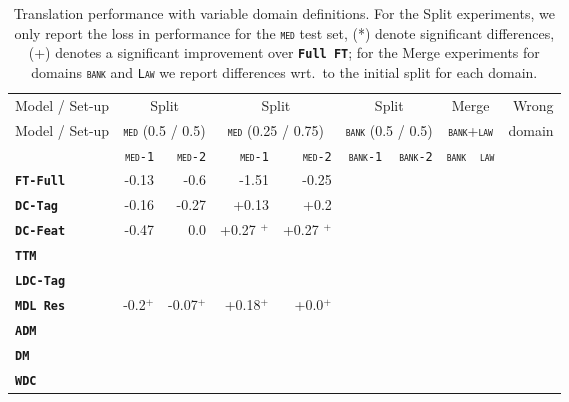 \documentclass[11pt]{article}
\newcommand{\fyTodo}[1]{\Todo[FY:]{\textcolor{orange}{#1}}}
\newcommand{\domain}[1]{\texttt{\textsc{#1}}}
\newcommand{\system}[1]{\texttt{\textbf{#1}}}
\begin{document}
\begin{table}
  \centering
  \begin{tabular}{|p{2.5cm}|*{9}{r|}} \hline
    Model / Set-up & \multicolumn{2}{c|}{Split} &  \multicolumn{2}{c|}{Split} & \multicolumn{2}{c|}{Split} & \multicolumn{2}{c|}{Merge} & Wrong \\ %
     Model / Set-up & \multicolumn{2}{c|}{\domain{med} \footnotesize{(0.5 / 0.5)}} &  \multicolumn{2}{c|}{\domain{med} {\footnotesize (0.25 / 0.75)}} & \multicolumn{2}{c|}{\domain{bank} {\footnotesize (0.5 / 0.5)}} & \multicolumn{2}{c|}{\domain{bank}+\domain{law}} & domain \\ \hline
    & \domain{med-1} & \domain{med-2} & \domain{med-1} & \domain{med-2} &  \domain{bank-1} & \domain{bank-2} & \domain{bank} & \domain{law} & \\
    \system{FT-Full}      & -0.13 & -0.6 & -1.51& -0.25& & & & & \\
    \system{DC-Tag}     & -0.16 & -0.27& +0.13& +0.2& & & & & \\
    \system{DC-Feat}    & -0.47& 0.0 & +0.27 $^+$ & +0.27 $^+$& & & & & \\
    \system{TTM}          & & & & & & & & &  \\
    \system{LDC-Tag}   & & & & & & & & & \\ 
                     
    \system{MDL Res}   & -0.2$^+$& -0.07$^+$&+0.18$^+$  &+0.0$^+$ & & & & & \\

    \system{ADM} & & & & & & & & & \\
    \system{DM}    & & & & & & & & & \\
    \system{WDC}  & & & & & & & & & \\
    \hline
  \end{tabular}
  \caption{Translation performance with variable domain definitions. For the Split experiments, we only report the loss in performance for the \domain{med} test set, (*) denote significant differences, (+) denotes a significant improvement over \system{Full FT}; for the Merge experiments for domains \domain{bank} and \domain{Law} we report differences wrt.\ to the initial split for each domain.\fyTodo{How about wrong ?}}
  \label{tab:performance}
\end{table}
\end{document}
